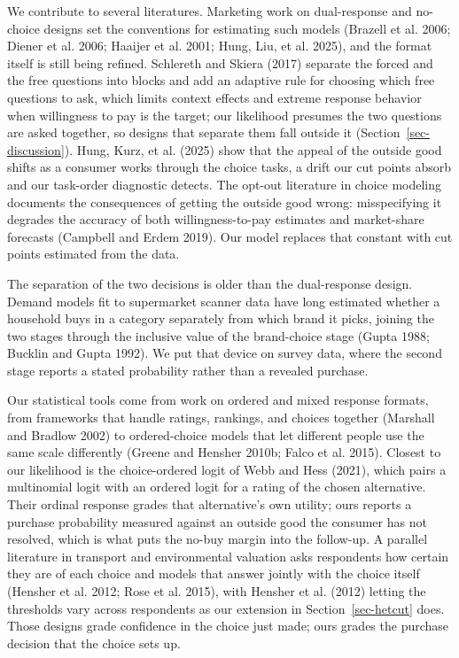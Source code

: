 \documentclass[
  letterpaper,
  DIV=11,
  numbers=noendperiod]{scrartcl}
\theoremstyle{plain}
\theoremstyle{plain}
\theoremstyle{plain}
\theoremstyle{remark}
\begin{document}
We contribute to several literatures. Marketing work on dual-response
and no-choice designs set the conventions for estimating such models
(Brazell et al. 2006; Diener et al. 2006; Haaijer et al. 2001; Hung,
Liu, et al. 2025), and the format itself is still being refined.
Schlereth and Skiera (2017) separate the forced and the free questions
into blocks and add an adaptive rule for choosing which free questions
to ask, which limits context effects and extreme response behavior when
willingness to pay is the target; our likelihood presumes the two
questions are asked together, so designs that separate them fall outside
it (Section~\ref{sec-discussion}). Hung, Kurz, et al. (2025) show that
the appeal of the outside good shifts as a consumer works through the
choice tasks, a drift our cut points absorb and our task-order
diagnostic detects. The opt-out literature in choice modeling documents
the consequences of getting the outside good wrong: misspecifying it
degrades the accuracy of both willingness-to-pay estimates and
market-share forecasts (Campbell and Erdem 2019). Our model replaces
that constant with cut points estimated from the data.

The separation of the two decisions is older than the dual-response
design. Demand models fit to supermarket scanner data have long
estimated whether a household buys in a category separately from which
brand it picks, joining the two stages through the inclusive value of
the brand-choice stage (Gupta 1988; Bucklin and Gupta 1992). We put that
device on survey data, where the second stage reports a stated
probability rather than a revealed purchase.

Our statistical tools come from work on ordered and mixed response
formats, from frameworks that handle ratings, rankings, and choices
together (Marshall and Bradlow 2002) to ordered-choice models that let
different people use the same scale differently (Greene and Hensher
2010b; Falco et al. 2015). Closest to our likelihood is the
choice-ordered logit of Webb and Hess (2021), which pairs a multinomial
logit with an ordered logit for a rating of the chosen alternative.
Their ordinal response grades that alternative's own utility; ours
reports a purchase probability measured against an outside good the
consumer has not resolved, which is what puts the no-buy margin into the
follow-up. A parallel literature in transport and environmental
valuation asks respondents how certain they are of each choice and
models that answer jointly with the choice itself (Hensher et al. 2012;
Rose et al. 2015), with Hensher et al. (2012) letting the thresholds
vary across respondents as our extension in Section~\ref{sec-hetcut}
does. Those designs grade confidence in the choice just made; ours
grades the purchase decision that the choice sets up.
\end{document}
